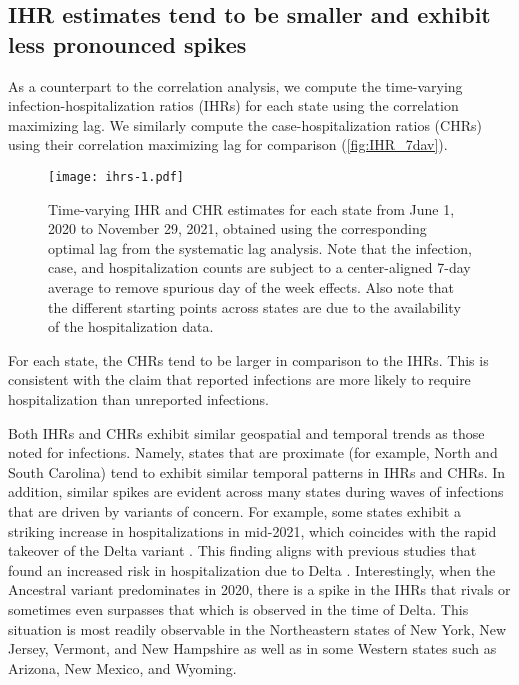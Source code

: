\subsection{IHR estimates tend to be smaller and exhibit less pronounced spikes}
\label{sec:ihrs}

As a counterpart to the correlation analysis, we compute the time-varying
infection-hospitalization ratios (IHRs) for each state using the correlation
maximizing lag. We similarly compute the case-hospitalization ratios (CHRs)
using their correlation maximizing lag for comparison
(\autoref{fig:IHR_7dav}). 

\begin{figure}[!tb]
\centering
\texttt{[image: ihrs-1.pdf]}
\caption{Time-varying IHR and CHR estimates for each state from June 1, 2020
to November 29, 2021, obtained using the corresponding optimal lag from the
systematic lag analysis. Note that the infection, case, and hospitalization
counts are subject to a center-aligned 7-day average to remove spurious day
of the week effects. Also note that the different starting points across
states are due to the availability of the hospitalization data.}
\label{fig:IHR_7dav}
\end{figure}
    

For each state, the CHRs tend to be larger in comparison to the IHRs. 
This is consistent with the claim that reported infections 
are more likely to require hospitalization than unreported infections. 

Both IHRs and CHRs exhibit similar
geospatial and temporal trends as those noted for infections. Namely,
states that are proximate (for example, North and South Carolina) tend
to exhibit similar temporal patterns in IHRs and CHRs. In addition, similar spikes are evident 
across many states during waves of infections that are driven
by variants of concern. For example, some states exhibit a striking increase in
hospitalizations in mid-2021, which coincides with the rapid takeover of the
Delta variant \citep{hodcroft2021covariants}. This finding aligns with previous
studies that found an increased risk in hospitalization due to Delta
\citep{twohig2022hospital, nyberg2022comparative}. Interestingly, when the
Ancestral variant predominates in 2020, there is a spike in the IHRs that rivals
or sometimes even surpasses that which is observed in the time of Delta. This situation is
most readily observable in the Northeastern states of 
New York, New Jersey, Vermont, and New Hampshire as well
as in some Western states such as Arizona, New Mexico, and Wyoming.

